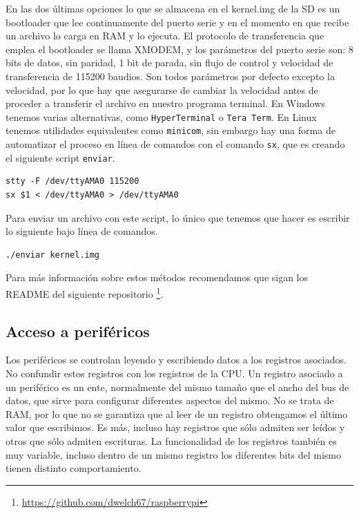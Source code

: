 En las dos últimas opciones lo que se almacena en el kernel.img de la SD es un bootloader
que lee continuamente del puerto serie y en el momento en que recibe un archivo lo carga
en RAM y lo ejecuta. El protocolo de transferencia que emplea el bootloader se llama XMODEM,
y los parámetros del puerto serie son: 8 bits de datos, sin paridad, 1 bit de parada, sin
flujo de control y velocidad de transferencia de 115200 baudios. Son todos parámetros por
defecto excepto la velocidad, por lo que hay que asegurarse de cambiar la velocidad antes
de proceder a transferir el archivo en nuestro programa terminal. En Windows tenemos varias
alternativas, como {\tt HyperTerminal} o {\tt Tera Term}. En Linux tenemos utilidades equivalentes
como {\tt minicom}, sin embargo hay una forma de automatizar el proceso en línea de comandos
con el comando {\tt sx}, que es creando el siguiente script {\tt enviar}.

\begin{lstlisting}
stty -F /dev/ttyAMA0 115200
sx $1 < /dev/ttyAMA0 > /dev/ttyAMA0
\end{lstlisting}

Para enviar un archivo con este script, lo único que tenemos que hacer es escribir lo siguiente
bajo línea de comandos.

\begin{lstlisting}
./enviar kernel.img
\end{lstlisting}

Para más información sobre estos métodos recomendamos que sigan los
README del siguiente repositorio \footnote{\url{https://github.com/dwelch67/raspberrypi}}.

\subsection{Acceso a periféricos}

Los periféricos se controlan leyendo y escribiendo datos a los registros asociados. No
confundir estos registros con los registros de la CPU. Un registro asociado a un periférico
es un ente, normalmente del mismo tamaño que el ancho del bus de datos, que sirve para
configurar diferentes aspectos del mismo. No se trata de RAM, por lo que no se garantiza que
al leer de un registro obtengamos el último valor que escribimos. Es más, incluso hay
registros que sólo admiten ser leídos y otros que sólo admiten escrituras. La funcionalidad
de los registros también es muy variable, incluso dentro de un mismo registro los diferentes
bits del mismo tienen distinto comportamiento.

